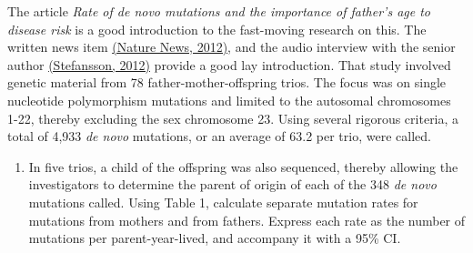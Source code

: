 \documentclass[letterpaper,11pt,twoside,]{pinp}
\providecommand{\tightlist}{%
  \setlength{\itemsep}{0pt}\setlength{\parskip}{0pt}}
\begin{document}
The article \emph{Rate of de novo mutations and the importance of
father's age to disease risk} is a good introduction to the fast-moving
research on this. The written news item
\href{http://www.nature.com/news/fathers-bequeath-more-mutations-as-they-age-1.11247}{(Nature News, 2012)},
and the audio interview with the senior author
\href{https://www.nature.com/nature/podcast/index-2012-08-23.html}{(Stefansson, 2012)}
provide a good lay introduction. That study involved genetic material
from 78 father-mother-offspring trios. The focus was on single
nucleotide polymorphism mutations and limited to the autosomal
chromosomes 1-22, thereby excluding the sex chromosome 23. Using several
rigorous criteria, a total of 4,933 \textit{de novo} mutations, or an
average of 63.2 per trio, were called.

\begin{enumerate}
\def\labelenumi{\alph{enumi})}
\tightlist
\item
  In five trios, a child of the offspring was also sequenced, thereby
  allowing the investigators to determine the parent of origin of each
  of the 348 \textit{de novo} mutations called. Using Table 1, calculate
  separate mutation rates for mutations from mothers and from fathers.
  Express each rate as the number of mutations per parent-year-lived,
  and accompany it with a 95\% CI.
\end{enumerate}





\end{document}
